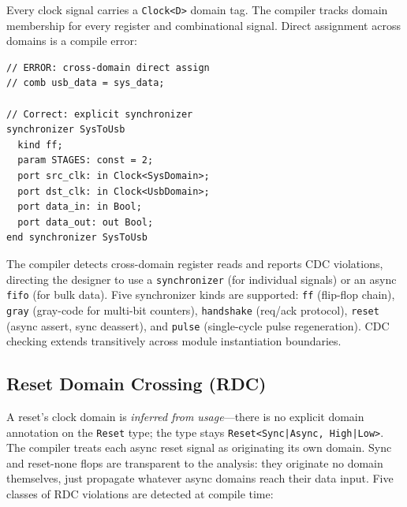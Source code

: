 \documentclass[11pt,twocolumn]{article}
\begin{document}
Every clock signal carries a \texttt{Clock<D>} domain tag. The compiler tracks domain membership for every register and combinational signal. Direct assignment across domains is a compile error:

\begin{lstlisting}[language=Arch,caption={Clock domain crossing via synchronizer},label={lst:cdc}]
// ERROR: cross-domain direct assign
// comb usb_data = sys_data;

// Correct: explicit synchronizer
synchronizer SysToUsb
  kind ff;
  param STAGES: const = 2;
  port src_clk: in Clock<SysDomain>;
  port dst_clk: in Clock<UsbDomain>;
  port data_in: in Bool;
  port data_out: out Bool;
end synchronizer SysToUsb
\end{lstlisting}

The compiler detects cross-domain register reads and reports CDC violations, directing the designer to use a \texttt{synchronizer} (for individual signals) or an async \texttt{fifo} (for bulk data). Five synchronizer kinds are supported: \texttt{ff} (flip-flop chain), \texttt{gray} (gray-code for multi-bit counters), \texttt{handshake} (req/ack protocol), \texttt{reset} (async assert, sync deassert), and \texttt{pulse} (single-cycle pulse regeneration). CDC checking extends transitively across module instantiation boundaries.

\subsection{Reset Domain Crossing (RDC)}
\label{sec:rdc}

A reset's clock domain is \emph{inferred from usage}---there is no explicit domain annotation on the \texttt{Reset} type; the type stays \texttt{Reset<Sync|Async, High|Low>}. The compiler treats each async reset signal as originating its own domain. Sync and reset-none flops are transparent to the analysis: they originate no domain themselves, just propagate whatever async domains reach their data input. Five classes of RDC violations are detected at compile time:
\end{document}
